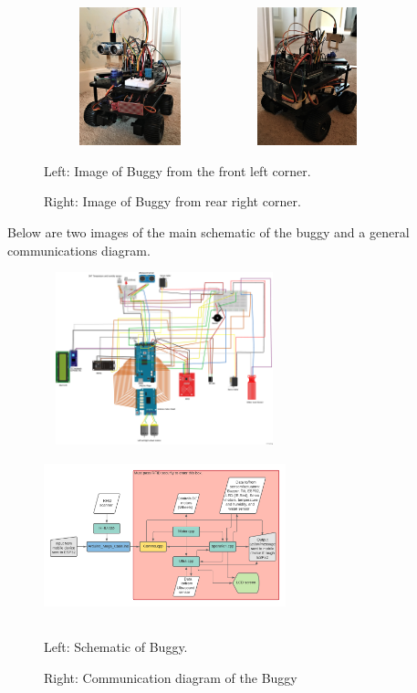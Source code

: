 \documentclass[8pt, a4paper]{article}
\begin{document}
\begin{figure}[H]
\centering
\includegraphics[height=4.0cm, width=5.0cm]{buggy_front}
\includegraphics[height=4.0cm, width=5.0cm]{Buggy_rear}
\caption{Left: Image of Buggy from the front left corner.}
\caption{Right: Image of Buggy from rear right corner.}
\end{figure} 


Below are two images of the main schematic of the buggy and a general communications diagram. 


\begin{figure}[H]
\includegraphics[height=5cm, width=7.0cm]{schematic}
\includegraphics[height=5cm, width=7.0cm]{Arch}
\caption{Left: Schematic of Buggy.}
\caption{Right: Communication diagram of the Buggy}
\end{figure}
\end{document}
